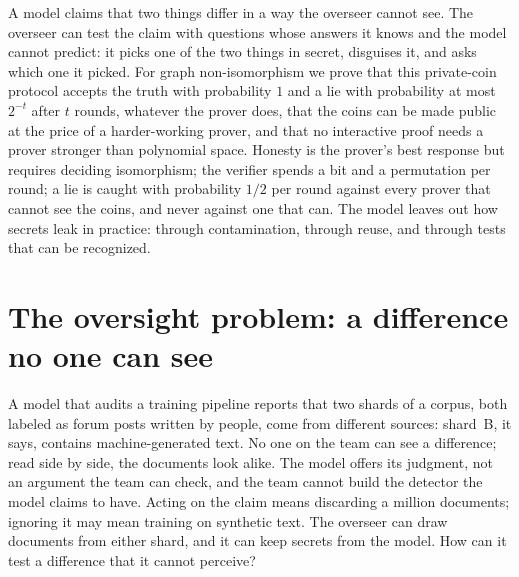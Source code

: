 \newcommand{\interactiontv}{d_{\mathrm{TV}}}
\newcommand{\interactionaut}{\operatorname{Aut}}
\newcommand{\interactiongni}{\mathrm{GNI}}
\newcommand{\interactiongi}{\mathrm{GI}}

\begin{refsection}

\begin{chaptersummary}
A model claims that two things differ in a way the overseer cannot see. The overseer can test the claim with questions whose answers it knows and the model cannot predict: it picks one of the two things in secret, disguises it, and asks which one it picked. For graph non-isomorphism we prove that this private-coin protocol accepts the truth with probability $1$ and a lie with probability at most $2^{-t}$ after $t$ rounds, whatever the prover does, that the coins can be made public at the price of a harder-working prover, and that no interactive proof needs a prover stronger than polynomial space. Honesty is the prover's best response but requires deciding isomorphism; the verifier spends a bit and a permutation per round; a lie is caught with probability $1/2$ per round against every prover that cannot see the coins, and never against one that can. The model leaves out how secrets leak in practice: through contamination, through reuse, and through tests that can be recognized.
\end{chaptersummary}

\section{The oversight problem: a difference no one can see}\label{sec:interaction:problem}

\begin{oversight}
A model that audits a training pipeline reports that two shards of a corpus, both labeled as forum posts written by people, come from different sources: shard~B, it says, contains machine-generated text. No one on the team can see a difference; read side by side, the documents look alike. The model offers its judgment, not an argument the team can check, and the team cannot build the detector the model claims to have. Acting on the claim means discarding a million documents; ignoring it may mean training on synthetic text. The overseer can draw documents from either shard, and it can keep secrets from the model. How can it test a difference that it cannot perceive?
\end{oversight}


\end{refsection}
